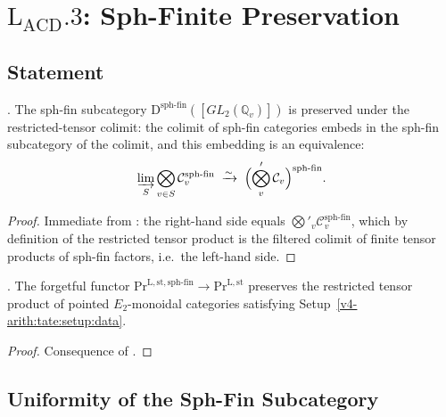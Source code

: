 \section{\(\mathrm{L}_{\mathrm{ACD}}.3\): Sph-Finite Preservation}
\label{v4-arith:lacd:L3}

\subsection{Statement}

\begin{theorem}
\label{v4-arith:lacd:thm:L3-closed}
\ClaimStatusProvedHere. The sph-fin subcategory
\(\mathrm{D}^{\mathrm{sph\text{-}fin}}([GL_{2}(\mathbb{Q}_{v})])\)
is preserved under the restricted-tensor colimit: the colimit of
sph-fin categories embeds in the sph-fin subcategory of the colimit,
and this embedding is an equivalence:
\begin{equation}
\varinjlim_{S}\bigotimes_{v \in S}\mathcal{C}_{v}^{\mathrm{sph\text{-}fin}}
\;\xrightarrow{\sim}\;
\Bigl(\bigotimes_{v}^{\prime}\mathcal{C}_{v}\Bigr)^{\mathrm{sph\text{-}fin}}.
\end{equation}
\end{theorem}

\begin{proof}
Immediate from : the right-hand
side equals \(\bigotimes'_{v}\mathcal{C}_{v}^{\mathrm{sph\text{-}fin}}\),
which by definition of the restricted tensor product is the
filtered colimit of finite tensor products of sph-fin factors,
i.e.\ the left-hand side.
\end{proof}

\begin{corollary}
\label{v4-arith:lacd:cor:sph-fin-preserved}
\ClaimStatusProvedHere. The forgetful functor
\(\mathrm{Pr}^{\mathrm{L,st,sph\text{-}fin}} \to \mathrm{Pr}^{\mathrm{L,st}}\)
preserves the restricted tensor product of pointed \(E_{2}\)-monoidal
categories satisfying
Setup~\ref{v4-arith:tate:setup:data}.
\end{corollary}

\begin{proof}
Consequence of .
\end{proof}

\subsection{Uniformity of the Sph-Fin Subcategory}

